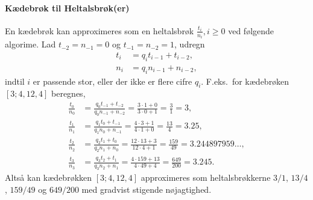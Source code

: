 \paragraph{Kædebrøk til Heltalsbrøk(er)}
En kædebrøk kan approximeres som en heltalsbrøk
$\frac{t_i}{n_i}, i \geq 0$ ved følgende algorime. Lad
$t_{-2} = n_{-1} = 0$ og $t_{-1} = n_{-2} =1$, udregn
\begin{align}
  t_i &= q_it_{i-1}+t_{i-2},
  \\n_i &= q_in_{i-1}+n_{i-2},
\end{align}
indtil $i$ er passende stor, eller der ikke er flere cifre
$q_i$.  F.eks.\ for kædebrøken $[3; 4, 12, 4]$ beregnes,
\begin{align}
  \frac{t_0}{n_0} &= \frac{q_0t_{-1} + t_{-2}}{q_0n_{-1}+n_{-2}} = \frac{3\cdot 1+0}{3\cdot 0 + 1} = \frac{3}{1} = 3,
  \\\frac{t_1}{n_1} &= \frac{q_1t_0 + t_{-1}}{q_1n_0+n_{-1}} = \frac{4\cdot 3 + 1}{4\cdot 1+0} = \frac{13}{4} = 3.25,
  \\\frac{t_2}{n_2} &= \frac{q_2t_1 + t_{0}}{q_2n_1+n_{0}} = \frac{12\cdot 13 + 3}{12\cdot 4 + 1} = \frac{159}{49} = 3.244897959\ldots,
  \\\frac{t_3}{n_3} &= \frac{q_3t_2 + t_{1}}{q_3n_2+n_{1}} = \frac{4\cdot 159 + 13}{4\cdot 49+4} = \frac{649}{200} = 3.245.
\end{align}
Altså kan kædebrøkken $[3;4, 12, 4]$ approximeres som heltalsbrøkkerne
$3/1$, $13/4$, $159/49$ og $649/200$ med gradvist stigende nøjagtighed.


